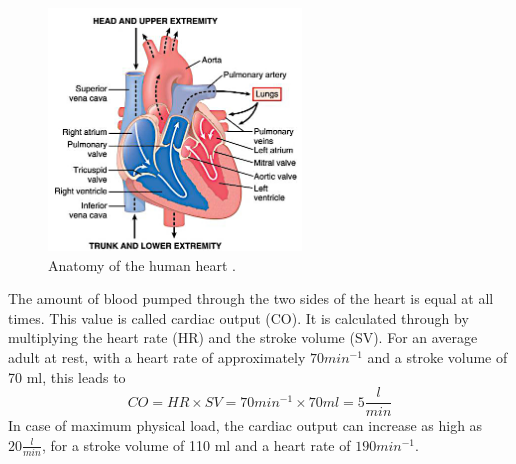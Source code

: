  \begin{figure}[h]
   \centering
   \includegraphics[width=0.6\textwidth]{images/heart_1.jpg}
   \caption{Anatomy of the human heart \cite{GH20}.}
   \label{fig:heart_anat}
 \end{figure}
 The amount of blood pumped through the two sides of the heart is equal at all times. This value is called cardiac output (CO). It is calculated through by multiplying the heart rate (HR) and the stroke volume (SV). For an average adult at rest, with a heart rate of approximately $70 min^{-1}$ and a stroke volume of 70 ml, this leads to
 \begin{equation}
   CO = HR \times SV = 70 min^{-1} \times 70ml = 5 \frac{l}{min}
  \label{eq:CO}
 \end{equation}
In case of maximum physical load, the cardiac output can increase as high as $20\frac{l}{min}$, for a stroke volume of 110 ml and a heart rate of $190 min^{-1}$. \cite{HKS4}

